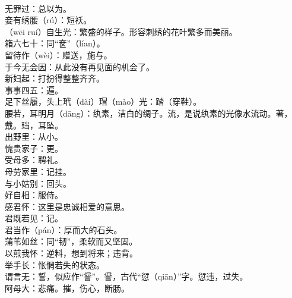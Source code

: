 \documentclass[a4paper, 12pt]{article}
\begin{document}
        \\ 无罪过：总以为。
        \\ 妾有绣腰（r\'{u}）：短袄。
        \\ （w\={e}i ru\'{i}）自生光：繁盛的样子。形容刺绣的花叶繁多而美丽。
        \\ 箱六七十：同“奁”（l\'{i}an）。
        \\ 留待作（w\`{e}i）：赠送，施与。
        \\ 于今无会因：从此没有再见面的机会了。
        \\ 新妇起：打扮得整整齐齐。
        \\ 事事四五：遍。
        \\ 足下丝履，头上玳（d\`{a}i）瑁（m\`{a}o）光：踏（穿鞋）。
        \\ 腰若，耳明月（d\={a}ng）：纨素，洁白的绸子。流，是说纨素的光像水流动。著，戴。珰，耳坠。
        \\ 出野里：从小。
        \\ 愧贵家子：更。
        \\ 受母多：聘礼。
        \\ 母劳家里：记挂。
        \\ 与小姑别：回头。
        \\ 好自相：服侍。
        \\ 感君怀：这里是忠诚相爱的意思。
        \\ 君既若见：记。
        \\ 君当作（p\'{a}n）：厚而大的石头。
        \\ 蒲苇如丝：同“韧”，柔软而又坚固。
        \\ 以煎我怀：逆料，想到将来；违背。
        \\ 举手长：怅惘若失的状态。
        \\ 谓言无：誓，似应作“諐”。諐，古代“愆（qi\={a}n）”字。愆违，过失。
        \\ 阿母大：悲痛。摧，伤心，断肠。
\end{document}
